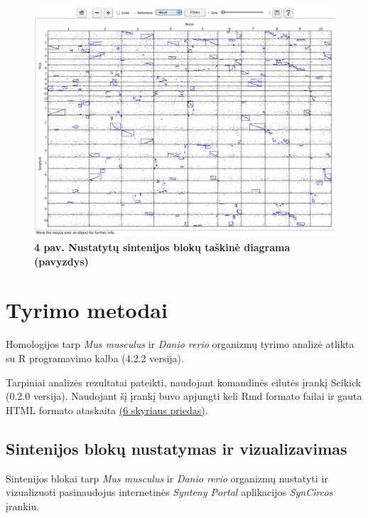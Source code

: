 \documentclass[12pt]{article}
\begin{document}
\begin{figure}[htb]
    \begin{center}
        \includegraphics[width=0.8\linewidth]{../Figures/Synteny_dotplot_example.png}
        \vspace{-0.5\baselineskip}
        \caption*{\small\textbf{4 pav. Nustatytų sintenijos blokų taškinė
                                diagrama (pavyzdys)}}
        \label{fig:4}
    \end{center}
\end{figure}

\newpage


\section{Tyrimo metodai}
Homologijos tarp \emph{Mus musculus} ir \emph{Danio rerio} organizmų tyrimo
analizė atlikta su R programavimo kalba\cite{R} (4.2.2 versija).

Tarpiniai analizės rezultatai pateikti, naudojant komandinės eilutės įrankį
Scikick\cite{SCIK} (0.2.0 versija). Naudojant šį įrankį buvo apjungti keli Rmd
formato failai ir gauta HTML formato ataskaita \hyperref[Priedas]{(6 skyriaus
priedas)}.

\subsection{Sintenijos blokų nustatymas ir vizualizavimas}
Sintenijos blokai tarp \emph{Mus musculus} ir \emph{Danio rerio} organizmų
nustatyti ir vizualizuoti pasinaudojus internetinės
\emph{Synteny Portal}\cite{SYN_PORT} aplikacijos \emph{SynCircos} įrankiu.
\end{document}
